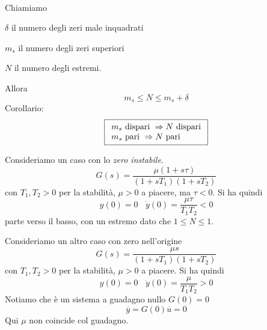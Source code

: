 \documentclass[10pt,a4paper]{book}
\begin{document}
\begin{theorem}
	\\
	Chiamiamo
	
	$\delta $ il numero degli zeri male inquadrati
	
	$m_s$ il numero degli zeri superiori
	
	$N$ il numero degli estremi.
	
	Allora
	\begin{equation*}
		\boxed{m_s \leqslant N\leqslant m_s +\delta }
	\end{equation*}
	Corollario:
	\begin{equation*}
		\boxed{
			\begin{array}{{>{\displaystyle}l}}
				m_s \ \text{dispari} \ \Rightarrow N\ \text{dispari} \\
				m_s \ \text{pari} \ \Rightarrow N\ \text{pari}       
			\end{array}
		}
	\end{equation*}
\end{theorem}

Consideriamo un caso con lo \textit{zero instabile}.
\begin{equation*}
	G(s)=\frac{\mu (1+s\tau)}{(1+sT_1)(1+sT_2)}
\end{equation*}
con $T_1 ,T_2  >0$ per la stabilità, $\mu  >0$ a piacere, ma $\tau < 0$. Si ha quindi
\begin{equation*}
	y(0) =0\ \ \ \ \dot{y}(0) =\frac{\mu \tau }{T_1 T_2} < 0
\end{equation*}
parte verso il basso, con un estremo dato che $1\leqslant N\leqslant 1$.

Consideriamo un altro caso con zero nell'origine
\begin{equation*}
	G(s)=\frac{\mu s}{(1+sT_1)(1+sT_2)}
\end{equation*}
con $T_1 ,T_2  >0$ per la stabilità, $\mu  >0$ a piacere. Si ha quindi
\begin{equation*}
	y(0) =0\ \ \ \ \dot{y}(0) =\frac{\mu }{T_1 T_2}  >0
\end{equation*}
Notiamo che è un sistema a guadagno nullo $G(0) =0$
\begin{equation*}
	\overline{y} =G(0)\overline{u} =0
\end{equation*}
Qui $\mu $ non coincide col guadagno.
\end{document}
